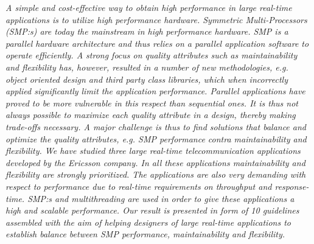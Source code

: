 \documentclass{article}
\begin{document}
{\emph{A simple and cost-effective way to obtain high performance in large real-time
applications is to utilize high performance hardware. Symmetric
Multi-Processors (SMP:s) are today the mainstream in high performance hardware.
SMP is a parallel hardware architecture and thus relies on a parallel
application software to operate efficiently. A strong focus on quality
attributes such as maintainability and flexibility has, however, resulted in a
number of new methodologies, e.g. object oriented design and third party class
libraries, which when incorrectly applied significantly limit the application
performance.  Parallel applications have proved to be more vulnerable in this
respect than sequential ones. It is thus not always possible to maximize each
quality attribute in a design, thereby making trade-offs necessary. A major
challenge is thus to find solutions that balance and optimize the quality
attributes, e.g. SMP performance contra maintainability and flexibility.  We
have studied three large real-time telecommunication applications developed by
the Ericsson company. In all these applications maintainability and flexibility
are strongly prioritized. The applications are also very demanding with respect
to performance due to real-time requirements on throughput and response-time.
SMP:s and multithreading are used in order to give these applications a high
and scalable performance.  Our result is presented in form of 10 guidelines
assembled with the aim of helping designers of large real-time applications to
establish balance between SMP performance, maintainability and flexibility.}

}
\end{document}

